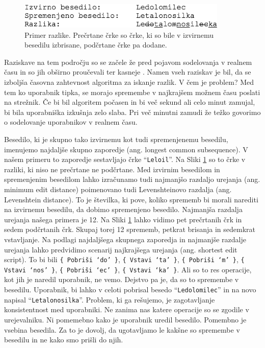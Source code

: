 \documentclass[a4paper, 12pt, twoside]{book}
\begin{document}
\begin{figure}[placement h]
\begin{center}
\includegraphics[width=10cm]{diff.png}
\end{center}
\caption{Primer razlike. Prečrtane črke so črke, ki so bile v izvirnemu besedilu izbrisane, podčrtane črke pa dodane.}
\label{diff}
\end{figure}

Raziskave na tem področju so se začele že pred pojavom sodelovanja v realnem času in so jih obširno proučevali \cite{f-cmpr, o-nd, o-np} ter kasneje \cite{diffstrg}. Namen vseh raziskav je bil, da se izboljša časovna zahtevnost algoritma za iskanje razlik. V čem je problem? Med tem ko uporabnik tipka, se morajo spremembe v najkrajšem možnem času poslati na strežnik. Če bi bil algoritem počasen in bi več sekund ali celo minut zamujal, bi bila uporabniška izkušnja zelo slaba. Pri več minutni zamudi že težko govorimo o sodelovanje uporabnikov v realnem času.

Besedilo, ki je skupno tako izvirnemu kot tudi spremenjenemu besedilu, imenujemo najdaljše skupno zaporedje (ang. longest common subsequence). V našem primeru to zaporedje sestavljajo črke “{\tt Leloil}”. Na Sliki \ref{diff} so to črke v razliki, ki niso ne prečrtane ne podčrtane. Med izvirnim besedilom in spremenjenim besedilom lahko izračunamo tudi najmanjšo razdaljo urejanja (ang. minimum edit distance) poimenovano tudi Levenshteinovo razdalja (ang. Levenshtein distance). To je številka, ki pove, koliko sprememb bi morali narediti na izvirnemu besedilu, da dobimo spremenjeno besedilo. Najmanjša razdalja urejanja našega primera je 12. Na Sliki \ref{diff} lahko vidimo pet prečrtanih črk in sedem podčrtanih črk. Skupaj torej 12 sprememb, petkrat brisanja in sedemkrat vstavljanje. Na podlagi najdaljšega skupnega zaporedja in najmanjše razdalje urejanja lahko predvidimo scenarij najkrajšega urejanja (ang. shortest edit script). To bi bili {\tt \{ Pobriši ‘do’ \}}, {\tt \{ Vstavi ‘ta’ \}}, {\tt \{ Pobriši ‘m’ \}}, {\tt \{ Vstavi ‘nos’ \}}, {\tt \{ Pobriši ‘ec’ \}}, {\tt \{ Vstavi ‘ka’ \}}. Ali so to res operacije, kot jih je naredil uporabnik, ne vemo. Dejstvo pa je, da so to spremembe v besedilu. Uporabnik, bi lahko v celoti pobrisal besedo “{\tt Ledolomilec}” in na novo napisal “{\tt Letalonosilka}”. Problem, ki ga rešujemo, je zagotavljanje konsistentnost med uporabniki. Ne zanima nas katere operacije so se zgodile v urejevalniku. Ni pomemebno kako je uporabnik uredil besedilo. Pomembno je vsebina besedila. Za to je dovolj, da ugotavljamo le kakšne so spremembe v besedilu in ne kako smo prišli do njih.
\end{document}
